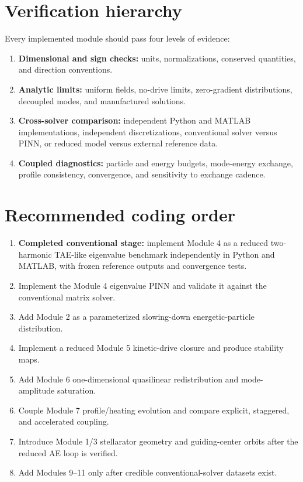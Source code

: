 \documentclass[11pt]{article}
\begin{document}
\section{Verification hierarchy}
Every implemented module should pass four levels of evidence:
\begin{enumerate}[leftmargin=1.6em]
\item \textbf{Dimensional and sign checks:} units, normalizations, conserved quantities, and direction conventions.
\item \textbf{Analytic limits:} uniform fields, no-drive limits, zero-gradient distributions, decoupled modes, and manufactured solutions.
\item \textbf{Cross-solver comparison:} independent Python and MATLAB implementations, independent discretizations, conventional solver versus PINN, or reduced model versus external reference data.
\item \textbf{Coupled diagnostics:} particle and energy budgets, mode-energy exchange, profile consistency, convergence, and sensitivity to exchange cadence.
\end{enumerate}

\section{Recommended coding order}
\begin{enumerate}[leftmargin=1.6em]
\item \textbf{Completed conventional stage:} implement Module 4 as a reduced two-harmonic TAE-like eigenvalue benchmark independently in Python and MATLAB, with frozen reference outputs and convergence tests.
\item Implement the Module 4 eigenvalue PINN and validate it against the conventional matrix solver.
\item Add Module 2 as a parameterized slowing-down energetic-particle distribution.
\item Implement a reduced Module 5 kinetic-drive closure and produce stability maps.
\item Add Module 6 one-dimensional quasilinear redistribution and mode-amplitude saturation.
\item Couple Module 7 profile/heating evolution and compare explicit, staggered, and accelerated coupling.
\item Introduce Module 1/3 stellarator geometry and guiding-center orbits after the reduced AE loop is verified.
\item Add Modules 9--11 only after credible conventional-solver datasets exist.
\end{enumerate}
\end{document}
